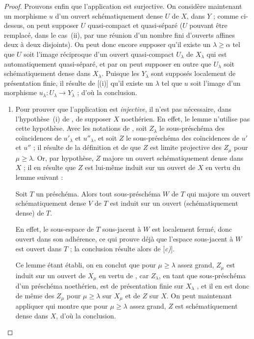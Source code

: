\begin{proof}
Prouvons enfin que l'application  est surjective.
On considère maintenant un morphisme $u$ d'un ouvert schématiquement dense $U$ de $X$, dans $Y$ ; comme ci-dessus, on peut supposer $U$ quasi-compact et quasi-séparé ($U$ pouvant être remplacé, dans le cas~(ii), par une réunion d'un nombre fini d'ouverts affines deux à deux disjoints).
On peut donc encore supposer qu'il existe un $\lambda\geq\alpha$ tel que $U$ soit l'image réciproque d'un ouvert quasi-compact $U_\lambda$ de $X_\lambda$  qui est automatiquement quasi-séparé, et par  on peut supposer en outre que $U_\lambda$ soit schématiquement dense dans $X_\lambda$.
Puisque les $Y_\lambda$ sont supposés localement de présentation finie, il résulte de [(i)] qu'il existe un $\lambda$ tel que $u$ soit l'image d'un morphisme $u_\lambda:U_\lambda\to Y_\lambda$ ; d'où la conclusion.

\begin{remarks}[20.3.8.7]
\label{IV.20.3.8.7}
\begin{enumerate}[label=(\roman*)]
  \item Pour prouver que l'application  est \emph{injective}, il n'est pas nécessaire, dans l'hypothèse~(i) de , de supposer $X$ noethérien.
  En effet, le lemme  n'utilise pas cette hypothèse.
  Avec les notations de , soit $Z_\lambda$ le sous-préschéma des coïncidences de $u'_\lambda$ et $u''_\lambda$, et soit $Z$ le sous-préschéma des coïncidences de $u'$ et $u''$ ; il résulte de la définition  et de  que $Z$ est limite projective des $Z_\mu$ pour $\mu\geq\lambda$.
  Or, par hypothèse, $Z$ majore un ouvert schématiquement dense dans $X$ ; il en résulte que $Z$ est lui-même induit sur un ouvert de $X$ en vertu du lemme suivant :

\begin{lemma}[20.3.8.8]
\label{IV.20.3.8.8}
Soit $T$ un préschéma.
Alors tout sous-préschéma $W$ de $T$ qui majore un ouvert schématiquement dense $V$ de $T$ est induit sur un ouvert (schématiquement dense) de $T$.
\end{lemma}

  En effet, le sous-espace de $T$ sous-jacent à $W$ est localement fermé, donc ouvert
  dans son adhérence, ce qui prouve déjà que l'espace sous-jacent à $W$ est ouvert dans $T$ ; la conclusion résulte alors de [\emph{c)}].

  Ce lemme étant établi, on en conclut que pour $\mu\geq\lambda$ assez grand, $Z_\mu$ est induit sur un ouvert de $X_\mu$ en vertu de , car $Z_\lambda$, en tant que sous-préschéma d'un préschéma noethérien, est de présentation finie sur $X_\lambda$ , et il en est donc de même des $Z_\mu$ pour $\mu\geq\lambda$ sur $X_\mu$ et de $Z$ sur $X$.
  On peut maintenant appliquer  qui montre que pour $\mu\geq\lambda$ assez grand, $Z$ est schématiquement dense dans $X$, d'où la conclusion.


\end{enumerate}
\end{remarks}
\end{proof}
